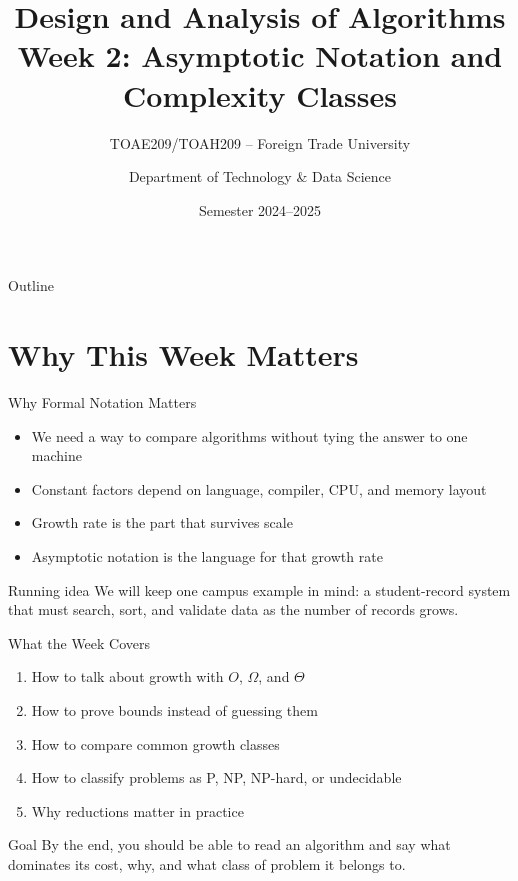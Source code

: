 \documentclass[aspectratio=169,xcolor=dvipsnames]{beamer}
\title[Algorithms -- Week 2]{\textbf{Design and Analysis of Algorithms}\\
\large Week 2: Asymptotic Notation and Complexity Classes}
\subtitle{TOAE209/TOAH209 -- Foreign Trade University}
\author{Department of Technology \& Data Science}
\date{Semester 2024--2025}
\begin{document}
\begin{frame}
  \titlepage
\end{frame}

\begin{frame}{Outline}
  \tableofcontents
\end{frame}

\section{Why This Week Matters}
\begin{frame}{Why Formal Notation Matters}
  \begin{itemize}
    \item We need a way to compare algorithms without tying the answer to one machine
    \item Constant factors depend on language, compiler, CPU, and memory layout
    \item Growth rate is the part that survives scale
    \item Asymptotic notation is the language for that growth rate
  \end{itemize}
  \begin{exampleblock}{Running idea}
    We will keep one campus example in mind: a student-record system that must search, sort, and validate data as the number of records grows.
  \end{exampleblock}
\end{frame}

\begin{frame}{What the Week Covers}
  \begin{enumerate}
    \item How to talk about growth with $O$, $\Omega$, and $\Theta$
    \item How to prove bounds instead of guessing them
    \item How to compare common growth classes
    \item How to classify problems as P, NP, NP-hard, or undecidable
    \item Why reductions matter in practice
  \end{enumerate}
  \begin{block}{Goal}
    By the end, you should be able to read an algorithm and say what dominates its cost, why, and what class of problem it belongs to.
  \end{block}
\end{frame}
\end{document}
